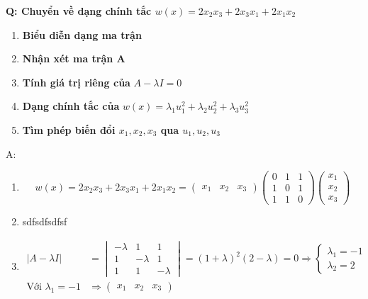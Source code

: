 \textbf{Q: Chuyển về dạng chính tắc $w(x) = 2x_2x_3 + 2x_3x_1 + 2x_1x_2$}
\begin{enumerate}
    \item \textbf{Biểu diễn dạng ma trận}
    \item \textbf{Nhận xét ma trận A}
    \item \textbf{Tính giá trị riêng của} $A - \lambda I = 0$
    \item \textbf{Dạng chính tắc của} $w(x) = \lambda_1u_1^2 + \lambda_2u_2^2 + \lambda_3u_3^2$
    \item \textbf{Tìm phép biến đổi $x_1, x_2, x_3$ qua $u_1, u_2, u_3$}
\end{enumerate}
A: \begin{enumerate}
    \item \begin{equation*}
        w(x) = 2x_2x_3 + 2x_3x_1 + 2x_1x_2
        = \begin{pmatrix}
            x_1 & x_2 & x_3
        \end{pmatrix}
        \begin{pmatrix}
            0 & 1 & 1\\
            1 & 0 & 1\\
            1 & 1 & 0
        \end{pmatrix}
        \begin{pmatrix}
            x_1\\
            x_2\\
            x_3
        \end{pmatrix}
    \end{equation*}
    \item sdfsdfsdfsf
    \item \begin{align*}
        |A - \lambda I| &= \begin{vmatrix}
            -\lambda & 1 & 1\\
            1 & -\lambda & 1\\
            1 & 1 & -\lambda
        \end{vmatrix} = (1+\lambda)^2(2 - \lambda) = 0 \Rightarrow \begin{cases}
            \lambda_1 = -1\\
            \lambda_2 = 2
        \end{cases}\\
        \textrm{Với } \lambda_1 = -1 &\Rightarrow \begin{pmatrix}
            x_1 & x_2 & x_3
        \end{pmatrix}

\end{align*}
\end{enumerate}
